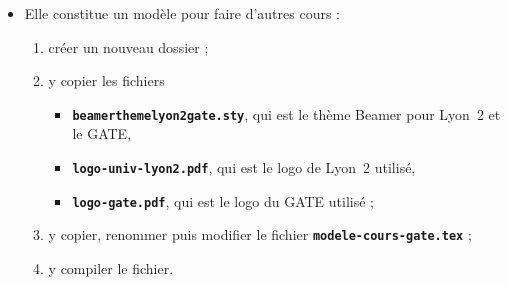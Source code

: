   \begin{itemize}
  \item Elle constitue un modèle pour faire d'autres cours :
    
    \begin{enumerate}
    \item créer un nouveau dossier ;
    \item y copier les fichiers 
      
      \begin{itemize}
      \item \texttt{\textbf{beamerthemelyon2gate.sty}}, qui est le thème Beamer pour Lyon~2 et le GATE,
      \item \texttt{\textbf{logo-univ-lyon2.pdf}}, qui est le logo de Lyon~2 utilisé,
      \item \texttt{\textbf{logo-gate.pdf}}, qui est le logo du GATE utilisé ;
      \end{itemize}
      
    \item y copier, renommer puis modifier le fichier \texttt{\textbf{modele-cours-gate.tex}} ;
    \item y compiler le fichier.
    \end{enumerate}
  \end{itemize}
